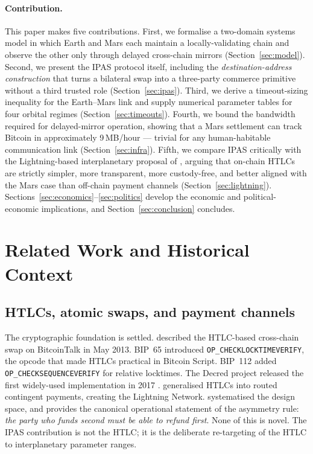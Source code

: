 \documentclass[11pt]{article}
\begin{document}
\paragraph{Contribution.}
This paper makes five contributions. First, we formalise a two-domain systems model in which Earth and Mars each maintain a locally-validating chain and observe the other only through delayed cross-chain mirrors (Section~\ref{sec:model}). Second, we present the IPAS protocol itself, including the \emph{destination-address construction} that turns a bilateral swap into a three-party commerce primitive without a third trusted role (Section~\ref{sec:ipas}). Third, we derive a timeout-sizing inequality for the Earth--Mars link and supply numerical parameter tables for four orbital regimes (Section~\ref{sec:timeouts}). Fourth, we bound the bandwidth required for delayed-mirror operation, showing that a Mars settlement can track Bitcoin in approximately 9\,MB/hour --- trivial for any human-habitable communication link (Section~\ref{sec:infra}). Fifth, we compare IPAS critically with the Lightning-based interplanetary proposal of \citet{puente2025}, arguing that on-chain HTLCs are strictly simpler, more transparent, more custody-free, and better aligned with the Mars case than off-chain payment channels (Section~\ref{sec:lightning}). Sections~\ref{sec:economics}--\ref{sec:politics} develop the economic and political-economic implications, and Section~\ref{sec:conclusion} concludes.

\section{Related Work and Historical Context}
\label{sec:related}

\subsection{HTLCs, atomic swaps, and payment channels}

The cryptographic foundation is settled. \citet{nolan2013} described the HTLC-based cross-chain swap on BitcoinTalk in May 2013. BIP~65 \citep{todd2014cltv} introduced \texttt{OP\_CHECKLOCKTIMEVERIFY}, the opcode that made HTLCs practical in Bitcoin Script. BIP~112 \citep{harding2016op} added \texttt{OP\_CHECKSEQUENCEVERIFY} for relative locktimes. The Decred project released the first widely-used implementation in 2017 \citep{decred2017}. \citet{poon2016lightning} generalised HTLCs into routed contingent payments, creating the Lightning Network. \citet{gudgeon2019sok} systematised the design space, and \citet{comit2023} provides the canonical operational statement of the asymmetry rule: \emph{the party who funds second must be able to refund first}. None of this is novel. The IPAS contribution is not the HTLC; it is the deliberate re-targeting of the HTLC to interplanetary parameter ranges.
\end{document}
